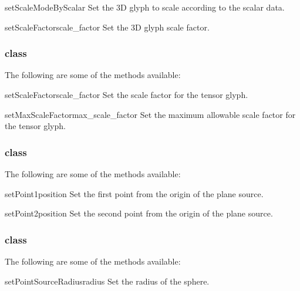 \begin{methoddesc}[Glyph3D]{setScaleModeByScalar}{}
Set the 3D glyph to scale according to the scalar data.
\end{methoddesc}

\begin{methoddesc}[Glyph3D]{setScaleFactor}{scale_factor}
Set the 3D glyph scale factor.
\end{methoddesc}

\subsubsection{\TensorGlyph class}

The following are some of the methods available:

\begin{methoddesc}[TensorGlyph]{setScaleFactor}{scale_factor}
Set the scale factor for the tensor glyph.
\end{methoddesc}

\begin{methoddesc}[TensorGlyph]{setMaxScaleFactor}{max_scale_factor}
Set the maximum allowable scale factor for the tensor glyph.
\end{methoddesc}

\subsubsection{\PlaneSource class}

The following are some of the methods available:

\begin{methoddesc}[PlaneSource]{setPoint1}{position}
Set the first point from the origin of the plane source.
\end{methoddesc}

\begin{methoddesc}[PlaneSource]{setPoint2}{position}
Set the second point from the origin of the plane source.
\end{methoddesc}

\subsubsection{\PointSource class}

The following are some of the methods available:

\begin{methoddesc}[PointSource]{setPointSourceRadius}{radius}
Set the radius of the sphere.
\end{methoddesc}


